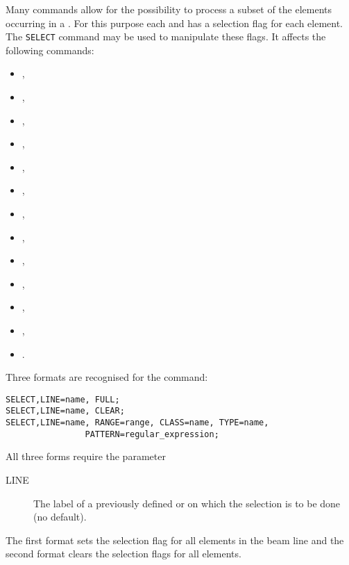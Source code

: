 Many \opal commands allow for the possibility to process
a subset of the elements occurring in a .
For this purpose each  and
 has a selection flag for each element.
The \texttt{SELECT} command may be used to manipulate these flags.
It affects the following commands:
\begin{itemize}
\item {},
\item {},
\item {},
\item {},
\item {},
\item {},
\item {},
\item {},
\item {},
\item {},
\item {},
\item {},
\item {}.
\end{itemize}
Three formats are recognised for the command:
\begin{verbatim}
SELECT,LINE=name, FULL;
SELECT,LINE=name, CLEAR;
SELECT,LINE=name, RANGE=range, CLASS=name, TYPE=name,
                PATTERN=regular_expression;
\end{verbatim}
All three forms require the parameter
\begin{description}
\item[LINE]
  The label of a previously defined  or
   on which the selection is to be done (no default).
\end{description}
The first format sets the selection flag for all elements in the beam line
and the second format clears the selection flags for all elements.

